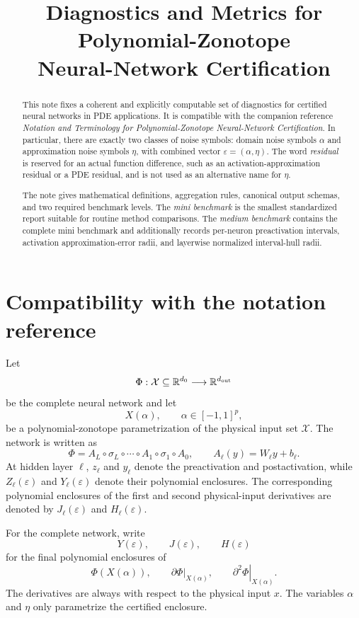\documentclass[11pt]{article}
\title{Diagnostics and Metrics for Polynomial-Zonotope\\
Neural-Network Certification}
\author{}
\date{}
\newcommand{\R}{\mathbb{R}}
\newcommand{\eps}{\varepsilon}
\begin{document}
\maketitle

\begin{abstract}
This note fixes a coherent and explicitly computable set of diagnostics for
certified neural networks in PDE applications.  It is compatible with the
companion reference \emph{Notation and Terminology for Polynomial-Zonotope
Neural-Network Certification}.  In particular, there are exactly two classes
of noise symbols: domain noise symbols \(\alpha\) and approximation noise
symbols \(\eta\), with combined vector \(\eps=(\alpha,\eta)\).  The word
\emph{residual} is reserved for an actual function difference, such as an
activation-approximation residual or a PDE residual, and is not used as an
alternative name for \(\eta\).

The note gives mathematical definitions, aggregation rules, canonical output
schemas, and two required benchmark levels.  The \emph{mini benchmark} is the
smallest standardized report suitable for routine method comparisons.  The
\emph{medium benchmark} contains the complete mini benchmark and additionally
records per-neuron preactivation intervals, activation approximation-error
radii, and layerwise normalized interval-hull radii.
\end{abstract}

\section{Compatibility with the notation reference}

Let
\[
 \Phi:\mathcal X\subseteq\R^{d_0}\longrightarrow\R^{d_{\rm out}}
\]
be the complete neural network and let
\[
 X(\alpha),\qquad \alpha\in[-1,1]^p,
\]
be a polynomial-zonotope parametrization of the physical input set
\(\mathcal X\).  The network is written as
\[
 \Phi=A_L\circ\sigma_L\circ\cdots\circ A_1\circ\sigma_1\circ A_0,
 \qquad A_\ell(y)=W_\ell y+b_\ell.
\]
At hidden layer \(\ell\), \(z_\ell\) and \(y_\ell\) denote the preactivation
and postactivation, while \(Z_\ell(\eps)\) and \(Y_\ell(\eps)\) denote their
polynomial enclosures.  The corresponding polynomial enclosures of the first
and second physical-input derivatives are denoted by \(J_\ell(\eps)\) and
\(H_\ell(\eps)\).

For the complete network, write
\[
 Y(\eps),\qquad J(\eps),\qquad H(\eps)
\]
for the final polynomial enclosures of
\[
 \Phi(X(\alpha)),\qquad
 \left.\partial\Phi\right|_{X(\alpha)},\qquad
 \left.\partial^2\Phi\right|_{X(\alpha)}.
\]
The derivatives are always with respect to the physical input \(x\).  The
variables \(\alpha\) and \(\eta\) only parametrize the certified enclosure.
\end{document}
